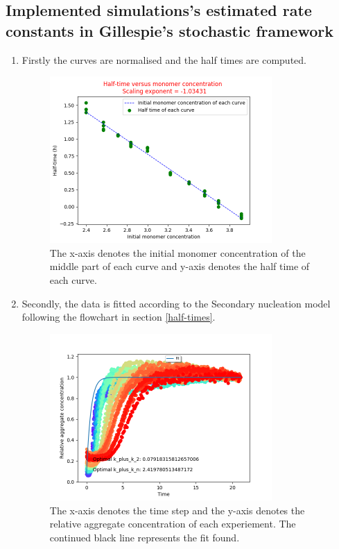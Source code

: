 \documentclass[11pt,a4paper]{article}
\begin{document}
\subsection{Implemented simulations's estimated rate constants in Gillespie's stochastic framework}
\begin{enumerate}
  \item Firstly the curves are normalised and the half times are computed.
    \begin{figure}[H]
    \centering
    \includegraphics[width=0.8\textwidth]{Images/half_time_vs_monomer.png}
    \caption{The x-axis denotes the initial monomer concentration of the middle part of each curve and y-axis denotes the half time of each curve.}
    \label{fig: sample trajectory}
    \end{figure}

  \item Secondly, the data is fitted according to the Secondary nucleation model following the flowchart in section \ref{half-times}.
    \begin{figure}[H]
    \centering
    \includegraphics[width=0.8\textwidth]{Images/SecondaryNucleationUnseeded.png}
    \caption{The x-axis denotes the time step and the y-axis denotes the relative aggregate concentration of each experiement. The continued black line represents the fit found.}
    \label{fig: sample trajectory}
    \end{figure}
\end{enumerate}
\end{document}
